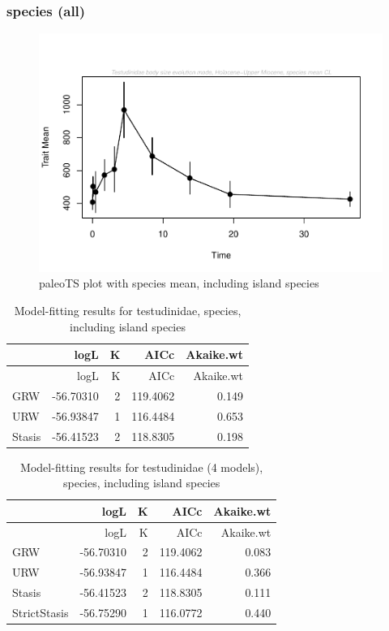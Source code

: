 \documentclass[]{article}
\begin{document}
\newpage

\subsubsection{species (all)}\label{species-all}

\begin{figure}[htbp]
\centering
\includegraphics{MA_JJ_files/figure-latex/paleoTS plot with species mean, including island species-1.pdf}
\caption{paleoTS plot with species mean, including island species}
\end{figure}

\begin{longtable}[]{@{}lrrrr@{}}
\caption{Model-fitting results for testudinidae, species, including
island species}\tabularnewline
\toprule
& logL & K & AICc & Akaike.wt\tabularnewline
\midrule
\endfirsthead
\toprule
& logL & K & AICc & Akaike.wt\tabularnewline
\midrule
\endhead
GRW & -56.70310 & 2 & 119.4062 & 0.149\tabularnewline
URW & -56.93847 & 1 & 116.4484 & 0.653\tabularnewline
Stasis & -56.41523 & 2 & 118.8305 & 0.198\tabularnewline
\bottomrule
\end{longtable}

\begin{longtable}[]{@{}lrrrr@{}}
\caption{Model-fitting results for testudinidae (4 models), species,
including island species}\tabularnewline
\toprule
& logL & K & AICc & Akaike.wt\tabularnewline
\midrule
\endfirsthead
\toprule
& logL & K & AICc & Akaike.wt\tabularnewline
\midrule
\endhead
GRW & -56.70310 & 2 & 119.4062 & 0.083\tabularnewline
URW & -56.93847 & 1 & 116.4484 & 0.366\tabularnewline
Stasis & -56.41523 & 2 & 118.8305 & 0.111\tabularnewline
StrictStasis & -56.75290 & 1 & 116.0772 & 0.440\tabularnewline
\bottomrule
\end{longtable}
\end{document}
